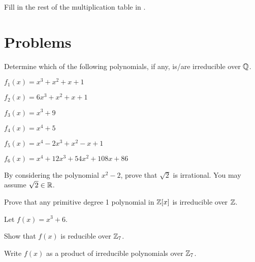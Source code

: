 \begin{exercise}\label{exercise-fill-in-missing-elements-in-table-of-Z3/<x^2+1>}
    Fill in the rest of the multiplication table in .
\end{exercise}



\section{Problems}
\begin{problem}
    Determine which of the following polynomials, if any, is/are irreducible over $\mathbb{Q}$.
    \begin{multicols}{2}
        \begin{partquestions}{\alph*}
            \item $f_1(x) = x^3 + x^2 + x + 1$
            \item $f_2(x) = 6x^3 + x^2 + x + 1$
            \item $f_3(x) = x^3 + 9$
            \item $f_4(x) = x^4 + 5$
            \item $f_5(x) = x^4 - 2x^3 + x^2 - x + 1$
            \item $f_6(x) = x^4 + 12x^3 + 54x^2 + 108x + 86$
        \end{partquestions}
    \end{multicols}
\end{problem}

\begin{problem}
    By considering the polynomial $x^2 - 2$, prove that $\sqrt2$ is irrational. You may assume $\sqrt2 \in \mathbb{R}$.
\end{problem}

\begin{problem}\label{problem-primitive-degree-1-polynomial-in-Z[x]-is-irreducible}
    Prove that any primitive degree 1 polynomial in $\mathbb{Z}[x]$ is irreducible over $\mathbb{Z}$.
\end{problem}

\begin{problem}
    Let $f(x) = x^3 + 6$.
    \begin{partquestions}{\roman*}
        \item Show that $f(x)$ is reducible over $\mathbb{Z}_7$.
        \item Write $f(x)$ as a product of irreducible polynomials over $\mathbb{Z}_7$.
    \end{partquestions}
\end{problem}

